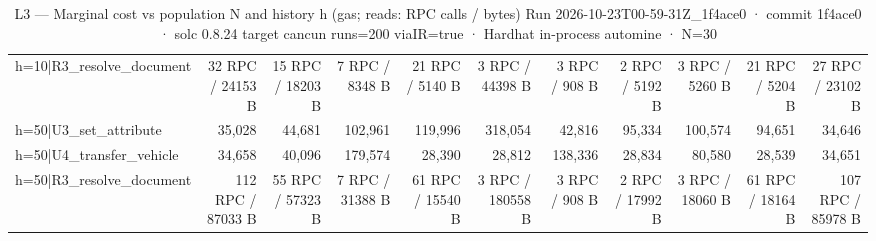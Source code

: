 \begin{table}[ht]
\begin{tabular}{lrrrrrrrrrr}
h=10|R3\_resolve\_document & 32 RPC / 24153 B & 15 RPC / 18203 B & 7 RPC / 8348 B & 21 RPC / 5140 B & 3 RPC / 44398 B & 3 RPC / 908 B & 2 RPC / 5192 B & 3 RPC / 5260 B & 21 RPC / 5204 B & 27 RPC / 23102 B \\
h=50|U3\_set\_attribute & 35,028 & 44,681 & 102,961 & 119,996 & 318,054 & 42,816 & 95,334 & 100,574 & 94,651 & 34,646 \\
h=50|U4\_transfer\_vehicle & 34,658 & 40,096 & 179,574 & 28,390 & 28,812 & 138,336 & 28,834 & 80,580 & 28,539 & 34,651 \\
h=50|R3\_resolve\_document & 112 RPC / 87033 B & 55 RPC / 57323 B & 7 RPC / 31388 B & 61 RPC / 15540 B & 3 RPC / 180558 B & 3 RPC / 908 B & 2 RPC / 17992 B & 3 RPC / 18060 B & 61 RPC / 18164 B & 107 RPC / 85978 B \\
\bottomrule
\end{tabular}
\caption{L3 — Marginal cost vs population N and history h (gas; reads: RPC calls / bytes) Run 2026-10-23T00-59-31Z\_1f4ace0 · commit 1f4ace0 · solc 0.8.24 target cancun runs=200 viaIR=true · Hardhat in-process automine · N=30}
\label{tab:scale}
\end{table}
